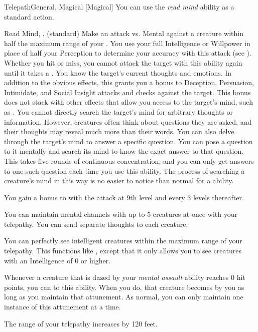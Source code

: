 \begin{feat}{Telepath}{General, Magical}
        [Magical] You can use the \textit{read mind} ability as a standard action.
        \begin{sustainability}{Read Mind}{, ,  (standard)}
            \rankline
            Make an attack vs. Mental against a creature within half the maximum range of your .
            You use your full Intelligence or Willpower in place of half your Perception to determine your accuracy with this attack (see ).
            Whether you hit or miss, you cannot attack the target with this ability again until it takes a .
            \hit You know the target's current thoughts and emotions.
            In addition to the obvious effects, this grants you a  bonus to Deception, Persuasion, Intimidate, and Social Insight attacks and checks against the target.
            This bonus does not stack with other effects that allow you access to the target's mind, such as .
            You cannot directly search the target's mind for arbitrary thoughts or information.
            However, creatures often think about questions they are asked, and their thoughts may reveal much more than their words.
            \crit You can also delve through the target's mind to answer a specific question.
            You can pose a question to it mentally and search its mind to know the exact answer to that question.
            This takes five rounds of continuous concentration, and you can only get answers to one such question each time you use this ability.
            The process of searching a creature's mind in this way is no easier to notice than normal for a  ability.

            \rankline
            You gain a  bonus to  with the attack at 9th level and every 3 levels thereafter.
        \end{sustainability}

         You can maintain mental channels with up to 5 creatures at once with your telepathy.
        You can send separate thoughts to each creature.

         You can perfectly see intelligent creatures within the maximum range of your telepathy.
        This functions like , except that it only allows you to see creatures with an Intelligence of 0 or higher.

         Whenever a creature that is dazed by your \textit{mental assault} ability reaches 0 hit points, you can  to this ability.
        When you do, that creature becomes \dominated by you as long as you maintain that attunement.
        As normal, you can only maintain one instance of this attunement at a time.

         The range of your telepathy increases by 120 feet.
    \end{feat}


